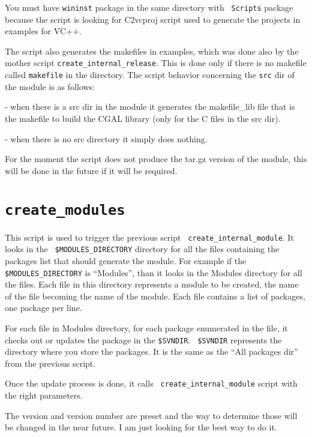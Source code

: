 You must have {\tt wininst} package in the same directory with {\tt
  Scripts} package because the script is looking for C2vcproj script
used to generate the projects in examples for VC++.

The script also generates the makefiles in examples, which was done
also by the mother script {\tt create\_internal\_release}. This is
done only if there is no makefile called {\tt makefile} in the
directory.  The script behavior concerning the {\tt src} dir of the
module is as follows:

- when there is a src dir in the module it generates the makefile\_lib
file that is the makefile to build the CGAL library (only for the C
files in the src dir).

  - when there is no src directory it simply does nothing.

  For the moment the script does not produce the tar.gz version of the
  module, this will be done in the future if it will be required.



\section{{\tt create\_modules}}
\label{sec:create_modules}

This script is used to trigger the previous script {\tt
  create\_internal\_module}. It looks in the {\tt
  \$MODULES\_DIRECTORY} directory for all the files containing the
packages list that should generate the module. For example if the {\tt
  \$MODULES\_DIRECTORY} is ``Modules'', than it looks in the Modules
directory for all the files. Each file in this directory represents a
module to be created, the name of the file becoming the name of the
module. Each file contains a list of packages, one package per line.

For each file in Modules directory, for each package enumerated in the
file, it checks out or updates the package in the {\tt \$SVNDIR}. {\tt
  \$SVNDIR} represents the directory where you store the packages. It
is the same as the ``All packages dir'' from the previous script.

Once the update process is done, it calls {\tt
  create\_internal\_module} script with the right parameters.

The version and version number are preset and the way to determine
those will be changed in the near future. I am just looking for the
best way to do it.



